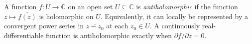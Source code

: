 
A function $f:U\to\mathbb C$ on an open set $U\subseteq\mathbb C$ is \emph{antiholomorphic} if the function $z\mapsto\overline{f(z)}$ is holomorphic on $U$. Equivalently, it can locally be represented by a convergent power series in $\overline{z-z_0}$ at each $z_0\in U$. A continuously real-differentiable function is antiholomorphic exactly when $\partial f/\partial z=0$.
